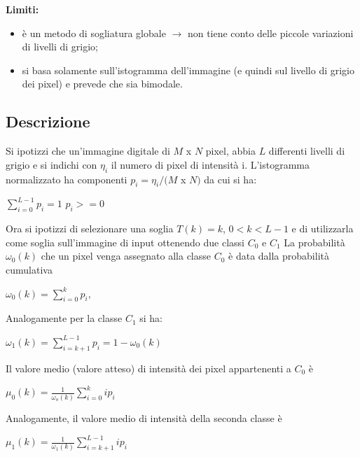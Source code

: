 \textbf{Limiti:}

\begin{itemize}
    \item è un metodo di sogliatura globale $\rightarrow$ non tiene conto delle piccole variazioni di livelli di grigio;
    \item si basa solamente sull'istogramma dell'immagine (e quindi sul livello di grigio dei pixel) e prevede che sia bimodale.
\end{itemize}

\subsection{Descrizione}

Si ipotizzi che un'immagine digitale di $M$ x $N$ pixel, abbia $L$ differenti livelli di grigio e si indichi con $\eta_i$
il numero di pixel di intensità i. L'istogramma normalizzato ha componenti $p_i = \eta_i/(M$ x $N)$ da cui si ha:

\begin{center}
    $\sum_{i=0}^{L-1}p_i = 1$ $p_i >= 0$
\end{center}

Ora si ipotizzi di selezionare una soglia $T(k) = k$, $0 < k < L - 1$ e di utilizzarla come soglia sull'immagine di input ottenendo due classi $C_0$ e $C_1$
La probabilità $\omega_0(k)$ che un pixel venga assegnato alla classe $C_0$ è data dalla probabilità cumulativa

\begin{center}
    $\omega_0(k) = \sum_{i=0}^{k}p_i,$
\end{center}

Analogamente per la classe $C_1$ si ha:

\begin{center}
    $\omega_1(k) = \sum_{i=k+1}^{L-1}p_i=1-\omega_0(k)$
\end{center}

Il valore medio (valore atteso) di intensità dei pixel appartenenti a
$C_0$ è

\begin{center}
    $\mu_0(k)=\frac{1}{\omega_o(k)} \sum_{i=0}^{k}ip_i$
\end{center}

Analogamente, il valore medio di intensità della seconda classe è

\begin{center}
    $\mu_1(k)=\frac{1}{\omega_1(k)}\sum_{i=k+1}^{L-1}ip_i$
\end{center}

